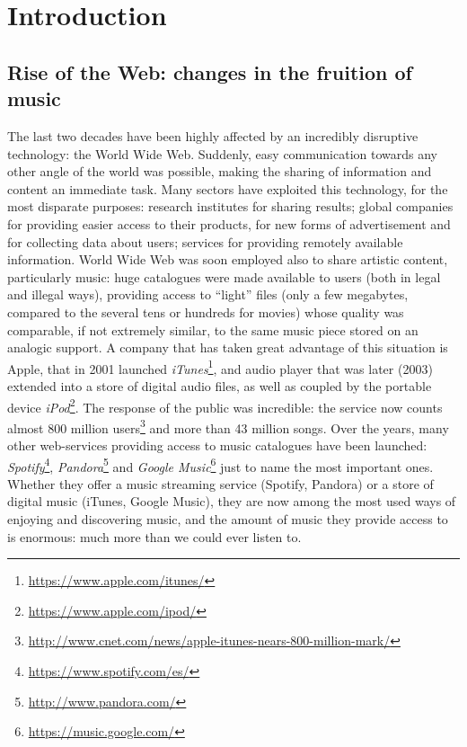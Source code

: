 
\chapter{Introduction} %

\label{Chapter1} %



\section{Rise of the Web: changes in the fruition of music}
The last two decades have been highly affected by an incredibly disruptive technology: the World Wide Web. Suddenly, easy communication towards any other angle of the world was possible, making the sharing of information and content an immediate task. Many sectors have exploited this technology, for the most disparate purposes: research institutes for sharing results; global companies for providing easier access to their products, for new forms of advertisement and for collecting data about users; services for providing remotely available information. World Wide Web was soon employed also to share artistic content, particularly music: huge catalogues were made available to users (both in legal and illegal ways), providing access to ``light'' files (only a few megabytes, compared to the several tens or hundreds for movies) whose quality was comparable, if not extremely similar, to the same music piece stored on an analogic support. A company that has taken great advantage of this situation is Apple, that in 2001 launched \textit{iTunes}\footnote{\url{https://www.apple.com/itunes/}}, and audio player that was later (2003) extended into a store of digital audio files, as well as coupled by the portable device \textit{iPod}\footnote{\url{https://www.apple.com/ipod/}}. The response of the public was incredible: the service now counts almost 800 million users\footnote{\url{http://www.cnet.com/news/apple-itunes-nears-800-million-mark/}} and more than 43 million songs. Over the years, many other web-services providing access to music catalogues have been launched: \textit{Spotify}\footnote{\url{https://www.spotify.com/es/}}, \textit{Pandora}\footnote{\url{http://www.pandora.com/}} and \textit{Google Music}\footnote{\url{https://music.google.com/}} just to name the most important ones. Whether they offer a music streaming service (Spotify, Pandora) or a store of digital music (iTunes, Google Music), they are now among the most used ways of enjoying and discovering music, and the amount of music they provide access to is enormous: much more than we could ever listen to.
